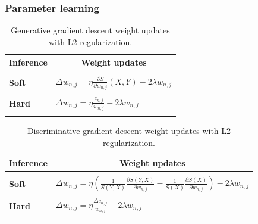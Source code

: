 \documentclass{beamer}
\newcommand{\ddspn}[2]{\frac{\partial#1}{\partial#2}}
\begin{document}
\begin{frame}
  \frametitle{Parameter learning}

  \scriptsize
  \begin{table}[h]
    \centering
    \begin{tabular}{l|l}
      \hline
      \multicolumn{1}{c}{\bfseries Inference} & \multicolumn{1}{c}{\bfseries Weight updates}\\
      \hline & \\
      \textbf{Soft} & \(\displaystyle \Delta w_{n,j}=\eta\ddspn{S}{w_{n,j}}(X, Y)-2\lambda w_{n,j} \) \\
      & \\
      \textbf{Hard} & \(\displaystyle \Delta w_{n,j}=\eta\frac{c_{n,j}}{w_{n,j}}-2\lambda w_{n,j} \) \\
      & \\
      \hline
    \end{tabular}
    \captionsetup{justification=centering}
    \caption*{\scriptsize Generative gradient descent weight updates with L2 regularization.}
  \end{table}
  \begin{table}[h]
    \centering
    \begin{tabular}{l|l}
      \hline
      \multicolumn{1}{c}{\bfseries Inference} & \multicolumn{1}{c}{\bfseries Weight updates}\\
      \hline & \\
      \textbf{Soft} & \(\displaystyle \Delta
        w_{n,j}=\eta\left(\frac{1}{S(Y,X)}\ddspn{S(Y,X)}{w_{n,j}}-\frac{1}{S(X)}
          \ddspn{S(X)}{w_{n,j}}\right)-2\lambda w_{n,j} \) \\
      & \\
      \textbf{Hard} & \(\displaystyle \Delta w_{n,j}=\eta\frac{\Delta c_{n,j}}{w_{n,j}}-2\lambda w_{n,j} \) \\
      & \\
      \hline
    \end{tabular}
    \captionsetup{justification=centering}
    \caption*{\scriptsize Discriminative gradient descent weight updates with L2 regularization.}
  \end{table}
\end{frame}
\end{document}
